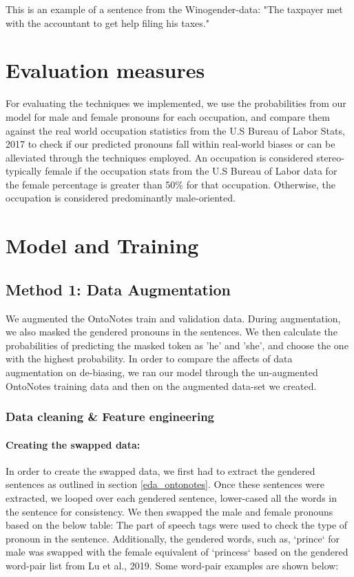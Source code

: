 \documentclass[10pt]{article}
\begin{document}
This is an example of a sentence from the Winogender-data:
"The taxpayer met with the accountant to get help filing his taxes."

\section{Evaluation measures}
For evaluating the techniques we implemented, we use the probabilities from our model for male and female pronouns for each occupation, and compare them against the real world occupation statistics from the U.S Bureau of Labor Stats, 2017 to check if our predicted pronouns fall within real-world biases or can be alleviated through the techniques employed. An occupation is considered stereo-typically female if the occupation stats from the U.S Bureau of Labor data for the female percentage is greater than 50\% for that occupation. Otherwise, the occupation is considered predominantly male-oriented.

\section{Model and Training}

\subsection{Method 1: Data Augmentation} \label{data_aug}
We augmented the OntoNotes train and validation data. During augmentation, we also masked the gendered pronouns in the sentences. We then calculate the probabilities of predicting the masked token as 'he' and 'she', and choose the one with the highest probability. In order to compare the affects of data augmentation on de-biasing, we ran our model through the un-augmented OntoNotes training data and then on the augmented data-set we created.

\subsubsection{Data cleaning & Feature engineering}

\paragraph{Creating the swapped data:}
In order to create the swapped data, we first had to extract the gendered sentences as outlined in section \ref{eda_ontonotes}. Once these sentences were extracted, we looped over each gendered sentence, lower-cased all the words in the sentence for consistency. We then swapped the male and female pronouns based on the below table:
The part of speech tags were used to check the type of pronoun in the sentence. 
Additionally, the gendered words, such as, `prince` for male was swapped with the female equivalent of `princess` based on the gendered word-pair list from Lu et al., 2019. Some word-pair examples are shown below:
\end{document}
